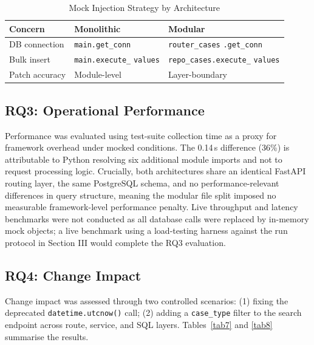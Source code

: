 \documentclass[conference]{IEEEtran}
\begin{document}
\begin{table}[H]
\caption{Mock Injection Strategy by Architecture}
\label{tab6}
\centering
{\scriptsize
\begin{tabularx}{\columnwidth}{|Y|Y|Y|}
\hline
\textbf{Concern} & \textbf{Monolithic} & \textbf{Modular} \\
\hline
DB connection & \texttt{main.get\_conn} & \texttt{router\_cases} \texttt{.get\_conn} \\
\hline
Bulk insert & \texttt{main.execute\_} \texttt{values} & \texttt{repo\_cases.execute\_} \texttt{values} \\
\hline
Patch accuracy & Module-level & Layer-boundary \\
\hline
\end{tabularx}
}
\end{table}

\subsection*{RQ3: Operational Performance}

Performance was evaluated using test-suite collection time as a proxy for framework overhead under mocked conditions. The 0.14\,s difference (36\%) is attributable to Python resolving six additional module imports and not to request processing logic. Crucially, both architectures share an identical FastAPI routing layer, the same PostgreSQL schema, and no performance-relevant differences in query structure, meaning the modular file split imposed no measurable framework-level performance penalty. Live throughput and latency benchmarks were not conducted as all database calls were replaced by in-memory mock objects; a live benchmark using a load-testing harness against the run protocol in Section III would complete the RQ3 evaluation.

\subsection*{RQ4: Change Impact}

Change impact was assessed through two controlled scenarios: (1) fixing the deprecated \texttt{datetime.utcnow()} call; (2) adding a \texttt{case\_type} filter to the search endpoint across route, service, and SQL layers. Tables~\ref{tab7} and \ref{tab8} summarise the results.
\end{document}
